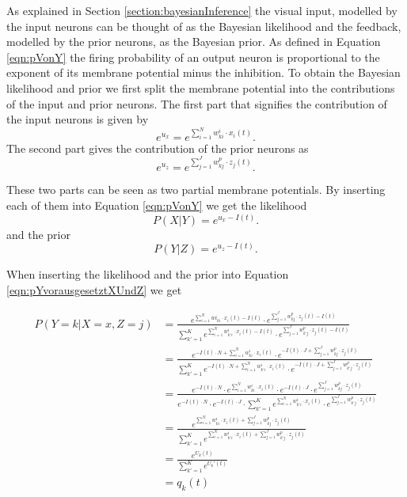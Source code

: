 As explained in Section \ref{section:bayesianInference} the visual input, modelled by the input neurons can be thought of as the Bayesian likelihood and the feedback, modelled by the prior neurons, as the Bayesian prior. As defined in Equation \ref{eqn:pVonY} the firing probability of an output neuron is proportional to the exponent of its membrane potential minus the inhibition. To obtain the Bayesian likelihood and prior we first split the membrane potential into the contributions of the input and prior neurons. The first part that signifies the contribution of the input neurons is given by
\begin{equation}
e^{u_x} = e^{\sum_{i=1}^N w^{i}_{ki} \cdot x_i(t)}.
\end{equation}
The second part gives the contribution of the prior neurons as
\begin{equation}
e^{u_z} = e^{\sum_{j=1}^J w^{p}_{kj} \cdot z_j(t)}.
\end{equation}

These two parts can be seen as two partial membrane potentials. By inserting each of them into Equation \ref{eqn:pVonY} we get the likelihood
\begin{equation}
P(X|Y) = e^{u_x - I(t)}.
\end{equation}
and the prior
\begin{equation}
P(Y|Z) = e^{u_z - I(t)}.
\end{equation}

When inserting the likelihood and the prior into Equation \ref{eqn:pYvorausgesetztXUndZ} we get

\begin{equation}
\begin{split}
P(Y=k|X=x,Z=j) &= \frac{e^{\sum_{i=1}^N w{i}_{ki} \cdot x_i(t) - I(t)} \cdot e^{\sum_{j=1}^J w^{p}_{kj} \cdot z_j(t) - I(t)}}{\sum_{k'=1}^K  e^{\sum_{i=1}^N w^{i}_{k'i} \cdot x_i(t) - I(t)} \cdot e^{\sum_{j=1}^J w^{p}_{k'j} \cdot z_j(t) - I(t)}}\\
&= \frac{e^{-I(t) \cdot N + \sum_{i=1}^N w^{i}_{ki} \cdot x_i(t)} \cdot e^{-I(t) \cdot J + \sum_{j=1}^J w^{p}_{kj} \cdot z_j(t)}}{\sum_{k'=1}^K  e^{-I(t) \cdot N + \sum_{i=1}^N w^{i}_{k'i} \cdot x_i(t)} \cdot e^{-I(t) \cdot J + \sum_{j=1}^J w^{p}_{k'j} \cdot z_j(t)}}\\
&= \frac{e^{-I(t) \cdot N} \cdot e^{\sum_{i=1}^N w^{i}_{ki} \cdot x_i(t)} \cdot e^{-I(t) \cdot J} \cdot e^{\sum_{j=1}^J w^{p}_{kj} \cdot z_j(t)}}{e^{-I(t) \cdot N} \cdot e^{-I(t) \cdot J} \cdot \sum_{k'=1}^K  e^{\sum_{i=1}^N w^{i}_{k'i} \cdot x_i(t)} \cdot e^{\sum_{j=1}^J w^{p}_{k'j} \cdot z_j(t)}}\\
&= \frac{e^{\sum_{i=1}^N w^{i}_{ki} \cdot x_i(t) + \sum_{j=1}^J w^{p}_{kj} \cdot z_j(t)}}{\sum_{k'=1}^K  e^{\sum_{i=1}^N w^{i}_{k'i} \cdot x_i(t) + \sum_{j=1}^J w^{p}_{k'j} \cdot z_j(t)}}\\
&= \frac{e^{U_k(t)}}{\sum_{k'=1}^K e^{U_k'(t)}}\\
&= q_k(t)
\end{split}
\end{equation}


